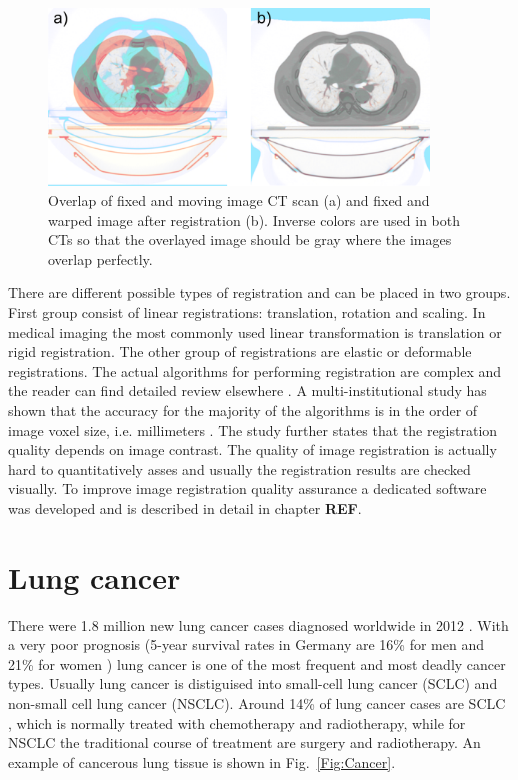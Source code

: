 \begin{figure}[H]
\begin{center}
\includegraphics[width=0.9\textwidth]{./Fundamentals/Images/RegistrationCompare.png}
\caption{Overlap of fixed and moving image CT scan (a) and fixed and warped image after registration (b). Inverse colors are used in both CTs so that the overlayed image should be gray
where the images overlap perfectly.}
\label{RegistrationCompare}
\end{center}
\end{figure}

There are different possible types of registration and can be placed in two groups. First group consist of linear registrations: translation, rotation and scaling. In medical imaging the most commonly used linear transformation 
is translation or rigid registration. The other group of registrations are elastic or deformable registrations. The actual algorithms for performing registration are complex and the reader can
find detailed review elsewhere \cite{Hill2001,Brock2006,Rietzel2006a}. A multi-institutional study has shown that the accuracy for the majority of the algorithms is in the order of image voxel
size, i.e. millimeters \cite{Brock2010}. The study further states that the registration quality depends on image contrast. The quality of image registration is actually hard to quantitatively
asses and usually the registration results are checked visually. To improve image registration quality assurance a dedicated software was developed and is described in detail in chapter \textbf{REF}.

\newpage




\section{Lung cancer}

There were 1.8 million new lung cancer cases diagnosed worldwide in 2012 \cite{Worldwide2012}. With a very poor prognosis (5-year survival rates in Germany are
16\% for men and 21\% for women \cite{Kaatsch2014}) lung cancer is one of the most frequent and most deadly cancer types. Usually lung cancer is distiguised
into small-cell lung cancer (SCLC) and non-small cell lung cancer (NSCLC). Around 14\% of lung cancer cases are SCLC \cite{Tsao2008}, which is normally treated with chemotherapy and radiotherapy, while for NSCLC the traditional course of treatment
are surgery and radiotherapy. An example of cancerous lung tissue is shown in Fig.~\ref{Fig:Cancer}.

